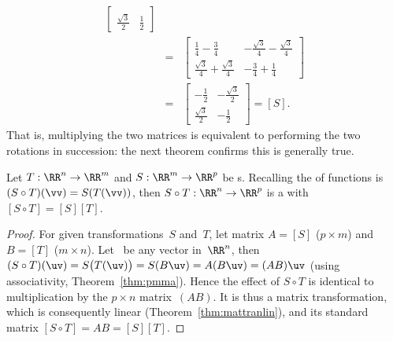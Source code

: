 \begin{example}
\begin{solution}
\begin{eqnarray*}
\begin{bmatrix}
\\\frac{\sqrt3}2&\frac12 \end{bmatrix}
\\&=&\begin{bmatrix} \tfrac14-\tfrac34 & -\tfrac{\sqrt3}4-\tfrac{\sqrt3}4
\\ \tfrac{\sqrt3}4+\tfrac{\sqrt3}4 & -\tfrac34+\tfrac14\end{bmatrix}
\\&=&\begin{bmatrix} -\frac12&-\frac{\sqrt3}2
\\\frac{\sqrt3}2&-\frac12 \end{bmatrix}=[S].
\end{eqnarray*}
That is, multiplying the two matrices is equivalent to performing the two rotations in succession: the next theorem confirms this is generally true.
\end{solution}
\end{example}





\begin{theorem} \label{thm:stmatcomp} 
Let \(T:\RR^n\to\RR^m\) and \(S:\RR^m\to\RR^p\) be s.  
Recalling the  of functions is \((S\circ T)(\vv)=S(T(\vv))\), then \(S\circ T:\RR^n\to\RR^p\) is a  with  \([S\circ T]=[S][T]\).
\end{theorem}
\begin{proof} 
For given transformations~\(S\) and~\(T\), let matrix \(A=[S]\) (\(p\times m\)) and \(B=[T]\) (\(m\times n\)).
Let \uv\ be any vector in~\(\RR^n\), then
\((S\circ T)(\uv)
=S\big(T(\uv)\big)
=S(B\uv)
=A(B\uv)
=(AB)\uv\) (using associativity, Theorem~\ref{thm:pmma}).
Hence the effect of \(S\circ T\) is identical to multiplication by the  \(p\times n\) matrix~\((AB)\).
It is thus a matrix transformation, which is consequently linear (Theorem~\ref{thm:mattranlin}), and its standard matrix \([S\circ T]=AB=[S][T]\).
\end{proof}



